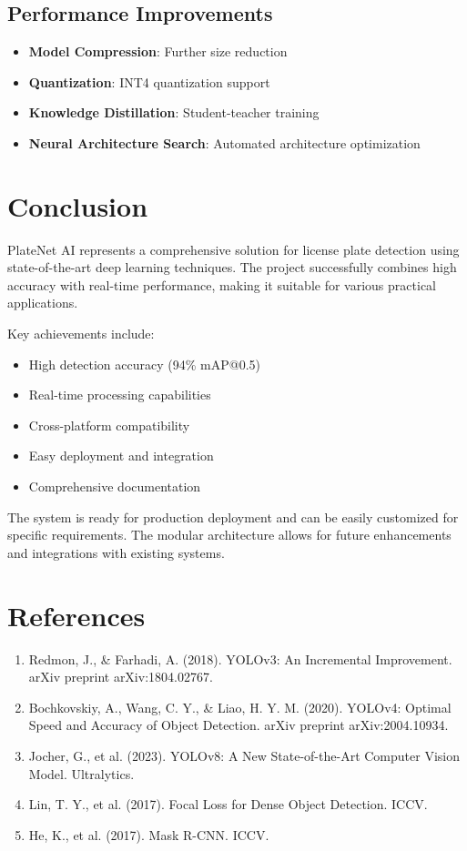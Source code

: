 \documentclass[12pt,a4paper]{article}
\begin{document}
\subsection{Performance Improvements}
\begin{itemize}
    \item \textbf{Model Compression}: Further size reduction
    \item \textbf{Quantization}: INT4 quantization support
    \item \textbf{Knowledge Distillation}: Student-teacher training
    \item \textbf{Neural Architecture Search}: Automated architecture optimization
\end{itemize}

\section{Conclusion}

PlateNet AI represents a comprehensive solution for license plate detection using state-of-the-art deep learning techniques. The project successfully combines high accuracy with real-time performance, making it suitable for various practical applications.

Key achievements include:
\begin{itemize}
    \item High detection accuracy (94\% mAP@0.5)
    \item Real-time processing capabilities
    \item Cross-platform compatibility
    \item Easy deployment and integration
    \item Comprehensive documentation
\end{itemize}

The system is ready for production deployment and can be easily customized for specific requirements. The modular architecture allows for future enhancements and integrations with existing systems.

\section{References}

\begin{enumerate}
    \item Redmon, J., \& Farhadi, A. (2018). YOLOv3: An Incremental Improvement. arXiv preprint arXiv:1804.02767.
    \item Bochkovskiy, A., Wang, C. Y., \& Liao, H. Y. M. (2020). YOLOv4: Optimal Speed and Accuracy of Object Detection. arXiv preprint arXiv:2004.10934.
    \item Jocher, G., et al. (2023). YOLOv8: A New State-of-the-Art Computer Vision Model. Ultralytics.
    \item Lin, T. Y., et al. (2017). Focal Loss for Dense Object Detection. ICCV.
    \item He, K., et al. (2017). Mask R-CNN. ICCV.
\end{enumerate}
\end{document}
